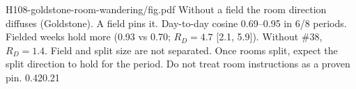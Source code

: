 {H108-goldstone-room-wandering/fig.pdf}
{Without a field the room direction diffuses (Goldstone). A field pins it.}
{Day-to-day cosine 0.69--0.95 in 6/8 periods. Fielded weeks hold more (0.93 vs 0.70; $R_D=4.7$ [2.1, 5.9]). Without \#38, $R_D=1.4$. Field and split size are not separated.}
{Once rooms split, expect the split direction to hold for the period. Do not treat room instructions as a proven pin.}
{0.42}{0.21}
